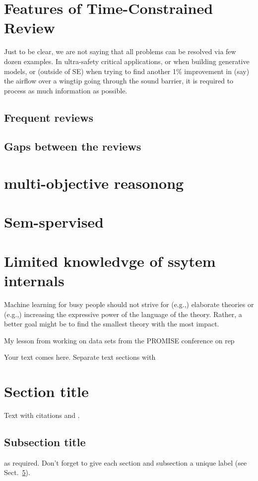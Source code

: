 \section{Features of Time-Constrained Review}

Just to be clear, we are not saying that all problems can be resolved via  few dozen examples. In ultra-safety critical applications, or when building generative models, or (outside of SE) when trying to find another 1\% improvement in (say) the airflow over a wingtip going through the sound barrier, it is required to process as much information as possible.

\subsection{Frequent reviews}

\subsection{Gaps between the reviews}

\section{multi-objective reasonong}

\section{Sem-spervised}

\section{Limited knowledvge of ssytem internals}


Machine learning for busy people should not strive
for (e.g.,) elaborate theories or (e.g.,) increasing the expressive power of the language of the
theory. Rather, a better goal might be to find the smallest theory with the most impact. 

My lesson from working on data sets from the PROMISE conference on rep

\label{intro}
Your text comes here. Separate text sections with
\section{Section title}
\label{sec:1}
Text with citations \cite{RefB} and \cite{RefJ}.
\subsection{Subsection title}
\label{sec:2}
as required. Don't forget to give each section
and subsection a unique label (see Sect.~\ref{sec:1}).
